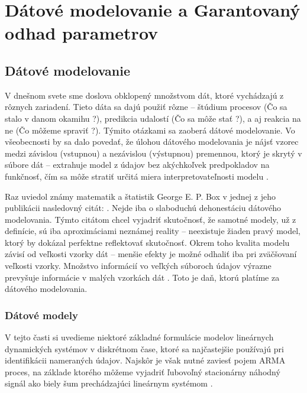 \part{Dátové modelovanie a Garantovaný odhad parametrov}
\chapter{Dátové modelovanie}
V dnešnom svete sme doslova obklopený množstvom dát, ktoré vychádzajú z rôznych zariadení. Tieto dáta sa dajú použiť rôzne -- štúdium procesov (Čo sa stalo v danom okamihu ?), predikcia udalostí (Čo sa môže stať ?), a aj reakcia na ne (Čo môžeme spraviť ?). Týmito otázkami sa zaoberá dátové modelovanie. Vo všeobecnosti by sa dalo povedať, že úlohou dátového modelovania je nájsť vzorec medzi závislou (vstupnou) a nezávislou (výstupnou) premennou, ktorý je skrytý v súbore dát -- extrahuje model z údajov bez akýchkoľvek predpokladov na funkčnosť, čím sa môže stratiť určitá miera interpretovateľnosti modelu \cite{mishra:data_modeling:2018}.

Raz uviedol známy matematik a štatistik George E. P. Box  v jednej z jeho publikácii nasledovný citát:  \cite{box:sas:1976}. Nejde iba o slaboduchú dehonestáciu dátového modelovania. Týmto citátom chcel vyjadriť skutočnosť, že samotné modely, už z definície, sú iba aproximáciami neznámej reality -- neexistuje žiaden pravý model, ktorý by dokázal perfektne reflektovať skutočnosť. Okrem toho kvalita modelu závisí od veľkosti vzorky dát -- menšie efekty je možné odhaliť iba pri zväčšovaní veľkosti vzorky. Množstvo informácií vo veľkých súboroch údajov výrazne prevyšuje informácie v malých vzorkách dát \cite{kenneth:understanding_stand_crit:2004}. Toto je daň, ktorú platíme za  dátového modelovania.

\section{Dátové modely}
V tejto časti si uvedieme niektoré základné formulácie modelov lineárnych dynamických systémov v diskrétnom čase, ktoré sa najčastejšie používajú pri identifikácii nameraných údajov. Najskôr je však nutné zaviesť pojem ARMA proces, na základe ktorého môžeme vyjadriť ľubovoľný stacionárny náhodný signál ako biely šum prechádzajúci lineárnym systémom \cite{fikar:identifikacia:1999}.

